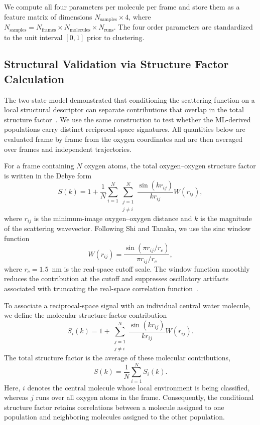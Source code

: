 \documentclass[aps, amsmath,amssymb, reprint, twocolumn, superscriptaddress]{revtex4-2}
\begin{document}
We compute all four parameters per molecule per frame and store them as a feature matrix of dimensions $N_{\text{samples}} \times 4$, where $N_{\text{samples}} = N_{\text{frames}} \times N_{\text{molecules}} \times N_{\text{runs}}$. The four order parameters are standardized to the unit interval $[0,1]$ prior to clustering.

\subsection{Structural Validation via Structure Factor Calculation}
\label{sec:structure_factor}

The two-state model demonstrated that conditioning the scattering function on a local structural descriptor can separate contributions that overlap in the total structure factor~\cite{shi_direct_2020,tanaka_revealing_2019}. We use the same construction to test whether the ML-derived populations carry distinct reciprocal-space signatures. All quantities below are evaluated frame by frame from the oxygen coordinates and are then averaged over frames and independent trajectories.

For a frame containing $N$ oxygen atoms, the total oxygen--oxygen structure factor is written in the Debye form~\cite{debye-1915,shi_direct_2020}
\begin{equation}
S(k) =
1+\frac{1}{N}\sum_{i=1}^{N}
\sum_{\substack{j=1\\j\neq i}}^{N}
\frac{\sin(k r_{ij})}{k r_{ij}}W(r_{ij}),
\label{eq:debye}
\end{equation}
where $r_{ij}$ is the minimum-image oxygen--oxygen distance and $k$ is the magnitude of the scattering wavevector. Following Shi and Tanaka, we use the sinc window function
\begin{equation}
W(r_{ij})=
\frac{\sin(\pi r_{ij}/r_c)}
{\pi r_{ij}/r_c},
\label{eq:window}
\end{equation}
where $r_c=1.5$~nm is the real-space cutoff scale. The window function smoothly reduces the contribution at the cutoff and suppresses oscillatory artifacts associated with truncating the real-space correlation function~\cite{shi_direct_2020}.

To associate a reciprocal-space signal with an individual central water molecule, we define the molecular structure-factor contribution
\begin{equation}
S_i(k)=
1+
\sum_{\substack{j=1\\j\neq i}}^{N}
\frac{\sin(k r_{ij})}{k r_{ij}}W(r_{ij}).
\label{eq:molecular_structure_factor}
\end{equation}
The total structure factor is the average of these molecular contributions,
\begin{equation}
S(k)=\frac{1}{N}\sum_{i=1}^{N}S_i(k).
\end{equation}
Here, $i$ denotes the central molecule whose local environment is being classified, whereas $j$ runs over all oxygen atoms in the frame. Consequently, the conditional structure factor retains correlations between a molecule assigned to one population and neighboring molecules assigned to the other population.
\end{document}
